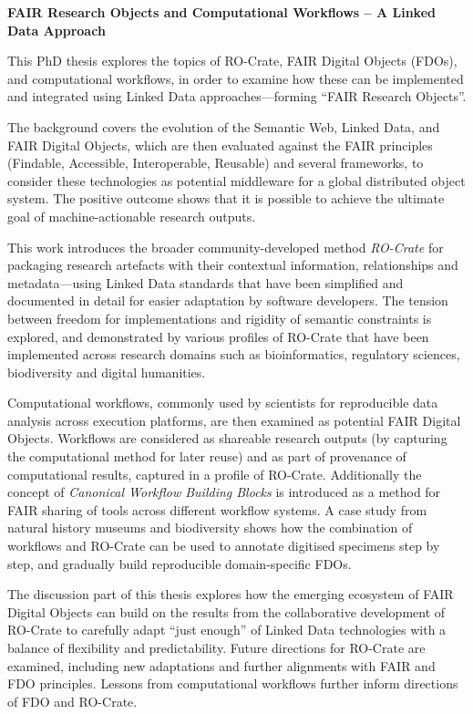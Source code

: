 \textbf{FAIR Research Objects and Computational Workflows – A Linked Data Approach}

\begin{small}

This PhD thesis explores the topics of RO-Crate, FAIR Digital Objects (FDOs), and computational workflows, in order to examine how these can be implemented and integrated using Linked Data approaches---forming ``FAIR Research Objects''.

The background covers the evolution of the Semantic Web, Linked Data, and FAIR Digital Objects, which are then evaluated against the FAIR principles (Findable, Accessible, Interoperable, Reusable) and several frameworks, to consider these technologies as potential middleware for a global distributed object system. The positive outcome shows that it is possible to achieve the ultimate goal of machine-actionable research outputs.

This work introduces the broader community-developed method \emph{RO-Crate} for packaging research artefacts with their contextual information, relationships and metadata---using Linked Data standards that have been simplified and documented in detail for easier adaptation by software developers. The tension between freedom for implementations and rigidity of semantic constraints is explored, and demonstrated by various profiles of RO-Crate that have been implemented across research domains such as bioinformatics, regulatory sciences, biodiversity and digital humanities.

Computational workflows, commonly used by scientists for reproducible data analysis across execution platforms, are then examined as potential FAIR Digital Objects. Workflows are considered as shareable research outputs (by capturing the computational method for later reuse) and as part of provenance of computational results, captured in a profile of RO-Crate. Additionally the concept of \emph{Canonical Workflow Building Blocks} is introduced as a method for FAIR sharing of tools across different workflow systems. A case study from natural history museums and biodiversity shows how the combination of workflows and RO-Crate can be used to annotate digitised specimens step by step, and gradually build reproducible domain-specific FDOs.

The discussion part of this thesis explores how the emerging ecosystem of FAIR Digital Objects can build on the results from the collaborative development of RO-Crate to carefully adapt ``just enough'' of Linked Data technologies with a balance of flexibility and predictability. Future directions for RO-Crate are examined, including new adaptations and further alignments with FAIR and FDO principles. Lessons from computational workflows further inform directions of FDO and RO-Crate. 


\end{small}

